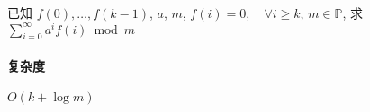 已知 \(f(0),\dots,f(k-1)\), \(a\), \(m\), \(f(i)=0,\quad \forall i\geq k\), \(m\in\mathbb{P}\), 求 \(\displaystyle \sum_{i=0}^{\infty} a^i f(i)\bmod{m}\)

\paragraph{复杂度} \(O(k+\log m)\)